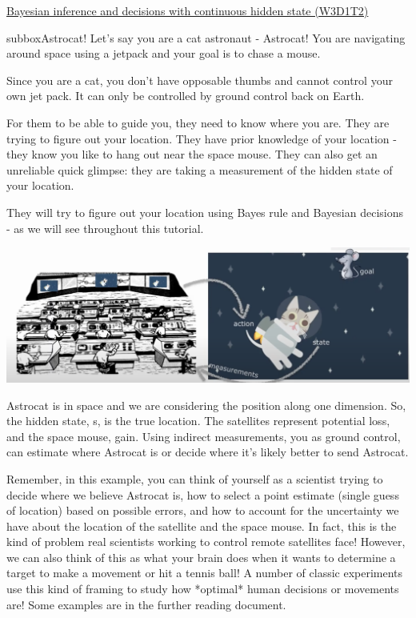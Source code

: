 \begin{textbox}{\href{https://compneuro.neuromatch.io/tutorials/W3D1_BayesianDecisions/student/W3D1_Tutorial2.html}{Bayesian inference and decisions with continuous hidden state (W3D1T2)} }
\begin{subbox}{subbox}{Astrocat!}
\scriptsize
Let's say you are a cat astronaut - Astrocat! You are navigating around space using a jetpack and your goal is to chase a mouse. 

Since you are a cat, you don't have opposable thumbs and cannot control your own jet pack. It can only be controlled by ground control back on Earth. 

For them to be able to guide you, they need to know where you are. They are trying to figure out your location. They have prior knowledge of your location - they know you like to hang out near the space mouse. They can also get an unreliable quick glimpse: they are taking a measurement of the hidden state of your location.

They will try to figure out your location using Bayes rule and Bayesian decisions - as we will see throughout this tutorial.


\begin{center}
    
\includegraphics[scale=0.1]{Figures/BD/BD_Figure5.png}
\end{center}


Astrocat is in space and we are considering the position along one dimension. So, the hidden state, s, is the true location. The satellites represent potential loss, and the space mouse, gain. Using indirect measurements, you as ground control, can estimate where Astrocat is or decide where it's likely better to send Astrocat.

Remember, in this example, you can think of yourself as a scientist trying to decide where we believe Astrocat is, how to select a point estimate (single guess of location) based on possible errors, and how to account for the uncertainty we have about the location of the satellite and the space mouse. In fact, this is the kind of problem real scientists working to control remote satellites face! However, we can also think of this as what your brain does when it wants to determine a target to make a movement or hit a tennis ball! A number of classic experiments use this kind of framing to study how *optimal* human decisions or movements are! Some examples are in the further reading document.


\end{subbox}
\end{textbox}
